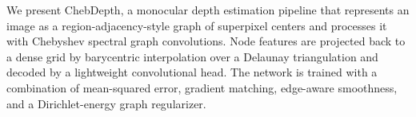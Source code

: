 We present ChebDepth, a monocular depth estimation pipeline that represents an image as a region-adjacency-style graph of superpixel centers and processes it with Chebyshev spectral graph convolutions.
Node features are projected back to a dense grid by barycentric interpolation over a Delaunay triangulation and decoded by a lightweight convolutional head.
The network is trained with a combination of mean-squared error, gradient matching, edge-aware smoothness, and a Dirichlet-energy graph regularizer.
